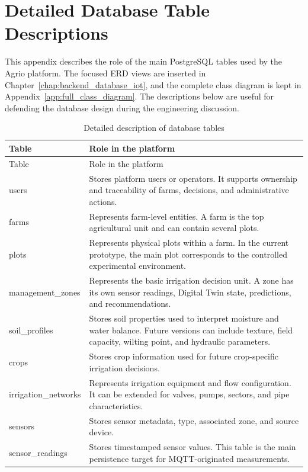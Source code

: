 \chapter{Detailed Database Table Descriptions}

This appendix describes the role of the main PostgreSQL tables used by the Agrio platform. The focused ERD views are inserted in Chapter~\ref{chap:backend_database_iot}, and the complete class diagram is kept in Appendix~\ref{app:full_class_diagram}. The descriptions below are useful for defending the database design during the engineering discussion.

\begin{footnotesize}
\setlength{\tabcolsep}{2pt}
\begin{longtable}{@{}>{\raggedright\arraybackslash}p{}>{\raggedright\arraybackslash}p{}@{}}
\caption{Detailed description of database tables}\\
\toprule
Table & Role in the platform \\
\midrule
\endfirsthead
\toprule
Table & Role in the platform \\
\midrule
\endhead
users & Stores platform users or operators. It supports ownership and traceability of farms, decisions, and administrative actions. \\
farms & Represents farm-level entities. A farm is the top agricultural unit and can contain several plots. \\
plots & Represents physical plots within a farm. In the current prototype, the main plot corresponds to the controlled experimental environment. \\
management\_zones & Represents the basic irrigation decision unit. A zone has its own sensor readings, Digital Twin state, predictions, and recommendations. \\
soil\_profiles & Stores soil properties used to interpret moisture and water balance. Future versions can include texture, field capacity, wilting point, and hydraulic parameters. \\
crops & Stores crop information used for future crop-specific irrigation decisions. \\
irrigation\_networks & Represents irrigation equipment and flow configuration. It can be extended for valves, pumps, sectors, and pipe characteristics. \\
sensors & Stores sensor metadata, type, associated zone, and source device. \\
sensor\_readings & Stores timestamped sensor values. This table is the main persistence target for MQTT-originated measurements. \\

\end{longtable}
\end{footnotesize}
